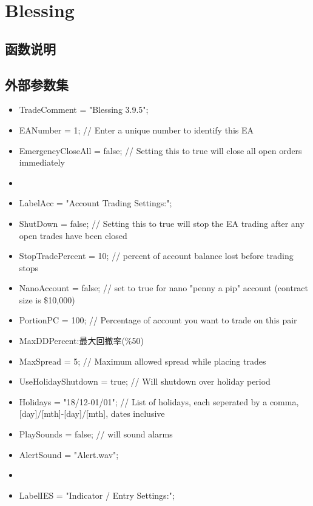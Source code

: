 \chapter{Blessing}


\section{函数说明}



\section{外部参数集}
\begin{itemize}


\item TradeComment        = "Blessing 3.9.5";
\item EANumber            = 1;        // Enter a unique number to identify this EA
\item EmergencyCloseAll   = false;    // Setting this to true will close all open orders immediately
\item 
\item LabelAcc            = "Account Trading Settings:";
\item ShutDown            = false;    // Setting this to true will stop the EA trading after any open trades have been closed
\item StopTradePercent    = 10;       // percent of account balance lost before trading stops
\item NanoAccount         = false;    // set to true for nano "penny a pip" account (contract size is \$10,000)
\item PortionPC           = 100;      // Percentage of account you want to trade on this pair
\item MaxDDPercent:最大回撤率(\%50)
\item MaxSpread           = 5;        // Maximum allowed spread while placing trades
\item UseHolidayShutdown  = true;     // Will shutdown over holiday period
\item Holidays            = "18/12-01/01"; // List of holidays, each seperated by a comma, [day]/[mth]-[day]/[mth], dates inclusive
\item PlaySounds          = false;    // will sound alarms
\item AlertSound          = "Alert.wav";
\item 
\item LabelIES            = "Indicator / Entry Settings:";

\end{itemize}
